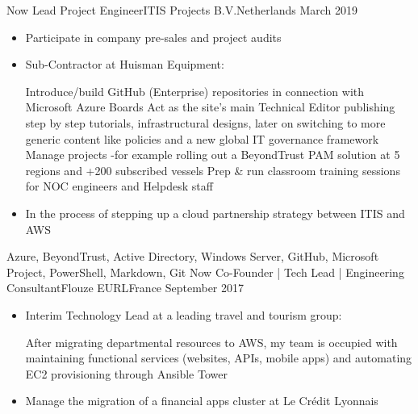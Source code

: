 %
%
%
\begin{experiences}
  \experience
    {Now}           {Lead Project Engineer}{ITIS Projects B.V.}{Netherlands}
    {March 2019}    {
                      \begin{itemize}
                        \item Participate in company pre-sales and project audits                        
                        \item Sub-Contractor at Huisman Equipment:
                        
                        \linebreak Introduce/build GitHub (Enterprise) repositories in connection with Microsoft Azure Boards
                        \linebreak Act as the site's main Technical Editor publishing step by step tutorials, infrastructural designs, later on switching to more generic content like policies and a new global IT governance framework
                        \linebreak Manage projects -for example rolling out a BeyondTrust PAM solution at 5 regions and +200 subscribed vessels
                        \linebreak Prep \& run classroom training sessions for NOC engineers and Helpdesk staff
                        
                        \item In the process of stepping up a cloud partnership strategy between ITIS and AWS           
                      \end{itemize}
                    }
                    {Azure, BeyondTrust, Active Directory, Windows Server, GitHub, Microsoft Project, PowerShell, Markdown, Git}
  \emptySeparator
  \experience
    {Now}           {Co-Founder | Tech Lead | Engineering Consultant}{Flouze EURL}{France}
    {September 2017}{
                      \begin{itemize}
                        \item Interim Technology Lead at a leading travel and tourism group: 
                        
                        \linebreak After migrating departmental resources to AWS, my team is occupied with maintaining functional services (websites, APIs, mobile apps) and automating EC2 provisioning through Ansible Tower                           
                        \item Manage the migration of a financial apps cluster at Le Crédit Lyonnais                       


\end{itemize}}
\end{experiences}
